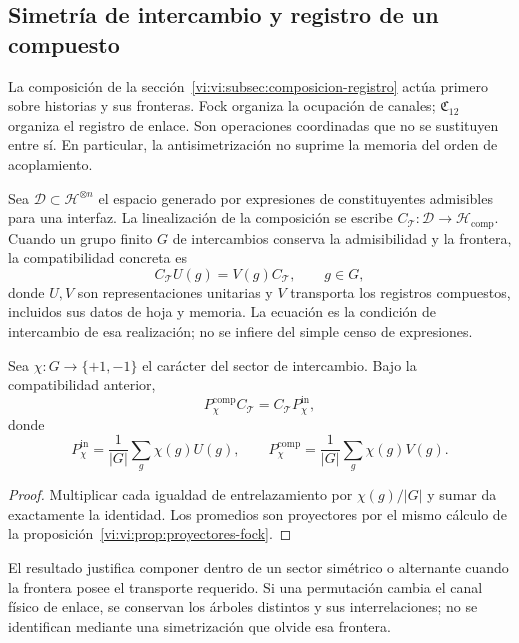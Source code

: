\subsection{Simetría de intercambio y registro de un compuesto}
\label{vi:vi:subsec:pauli-composicion}

La composición de la sección~\ref{vi:vi:subsec:composicion-registro}
actúa primero sobre historias y sus fronteras. Fock organiza
la ocupación de canales; \(\mathfrak C_{12}\) organiza el
registro de enlace. Son operaciones coordinadas que no se
sustituyen entre sí. En particular, la antisimetrización no
suprime la memoria del orden de acoplamiento.

Sea \(\mathcal D\subset\mathcal H^{\otimes n}\) el espacio
generado por expresiones de constituyentes admisibles para una
interfaz. La linealización de la composición se escribe
\(C_{\mathcal T}:\mathcal D\to\mathcal H_{\mathrm{comp}}\).
Cuando un grupo finito \(G\) de intercambios conserva la
admisibilidad y la frontera, la compatibilidad concreta es
\[
 C_{\mathcal T}U(g)=V(g)C_{\mathcal T},\qquad g\in G,
\]
donde \(U,V\) son representaciones unitarias y \(V\) transporta
los registros compuestos, incluidos sus datos de hoja y memoria.
La ecuación es la condición de
intercambio de esa realización; no se infiere del simple
censo de expresiones.

\begin{proposition}
\label{vi:vi:prop:composicion-estadistica}
Sea \(\chi:G\to\{+1,-1\}\) el carácter del sector de
intercambio. Bajo la compatibilidad anterior,
\[
 P_\chi^{\mathrm{comp}}C_{\mathcal T}
 =C_{\mathcal T}P_\chi^{\mathrm{in}},
\]
donde
\[
 P_\chi^{\mathrm{in}}=\frac1{|G|}\sum_g\chi(g)U(g),
 \qquad
 P_\chi^{\mathrm{comp}}=\frac1{|G|}\sum_g\chi(g)V(g).
\]
\end{proposition}
\begin{proof}
Multiplicar cada igualdad de entrelazamiento por
\(\chi(g)/|G|\) y sumar da exactamente la identidad.
Los promedios son proyectores por el mismo cálculo de
la proposición~\ref{vi:vi:prop:proyectores-fock}.
\end{proof}

El resultado justifica componer dentro de un sector simétrico
o alternante cuando la frontera posee el transporte requerido.
Si una permutación cambia el canal físico de enlace, se
conservan los árboles distintos y sus interrelaciones; no se
identifican mediante una simetrización que olvide esa frontera.

